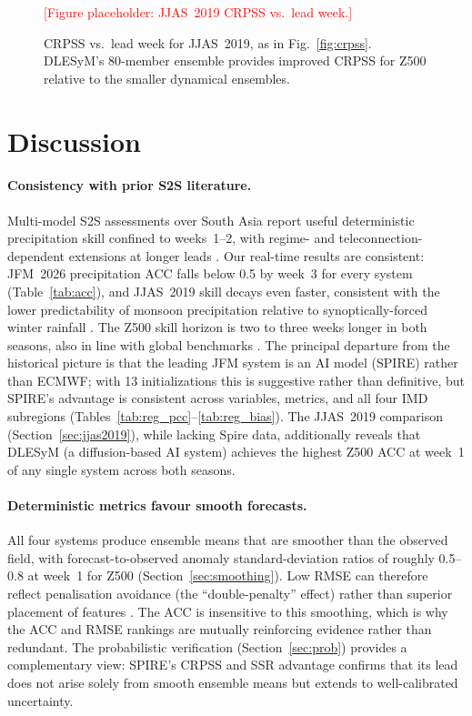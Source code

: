 \documentclass[11pt,a4paper]{article}
\newcommand{\ph}[1]{\textcolor{red}{[#1]}}
\begin{document}
\begin{figure}[htbp]
  \centering
  \ph{Figure placeholder: JJAS~2019 CRPSS vs.\ lead week.}
  \caption{CRPSS vs.\ lead week for JJAS~2019, as in Fig.~\ref{fig:crpss}.
  DLESyM's 80-member ensemble provides improved CRPSS for Z500 relative to
  the smaller dynamical ensembles.}
  \label{fig:jjas_crpss}
\end{figure}

\section{Discussion}\label{sec:discussion}

\paragraph{Consistency with prior S2S literature.}
Multi-model S2S assessments over South Asia report useful deterministic
precipitation skill confined to weeks~1--2, with regime- and
teleconnection-dependent extensions at longer leads
\citep{deandrade2019,white2017,mariotti2020}. Our real-time results are
consistent: JFM~2026 precipitation ACC falls below 0.5 by week~3 for every system
(Table~\ref{tab:acc}), and JJAS~2019 skill decays even faster, consistent with
the lower predictability of monsoon precipitation relative to synoptically-forced
winter rainfall \citep{lee2020}. The Z500 skill horizon is two to three weeks
longer in both seasons, also in line with global benchmarks \citep{vitart2017,rasp2024}.
The principal departure from the historical picture is that the leading
JFM system is an AI model (SPIRE) rather than ECMWF; with 13 initializations
this is suggestive rather than definitive, but SPIRE's advantage is
consistent across variables, metrics, and all four IMD subregions
(Tables~\ref{tab:reg_pcc}--\ref{tab:reg_bias}). The JJAS~2019 comparison
(Section~\ref{sec:jjas2019}), while lacking Spire data, additionally reveals
that DLESyM (a diffusion-based AI system) achieves the highest Z500 ACC at
week~1 of any single system across both seasons.

\paragraph{Deterministic metrics favour smooth forecasts.}
All four systems produce ensemble means that are smoother than
the observed field, with forecast-to-observed anomaly standard-deviation
ratios of roughly 0.5--0.8 at week~1 for Z500 (Section~\ref{sec:smoothing}).
Low RMSE can therefore reflect penalisation avoidance (the ``double-penalty''
effect) rather than superior placement of features
\citep{murphy1988,benbouallegue2024}. The ACC is insensitive to this
smoothing, which is why the ACC and RMSE rankings are mutually reinforcing
evidence rather than redundant. The probabilistic verification
(Section~\ref{sec:prob}) provides a complementary view: SPIRE's CRPSS
and SSR advantage confirms that its lead does not arise solely from smooth
ensemble means but extends to well-calibrated uncertainty.
\end{document}
